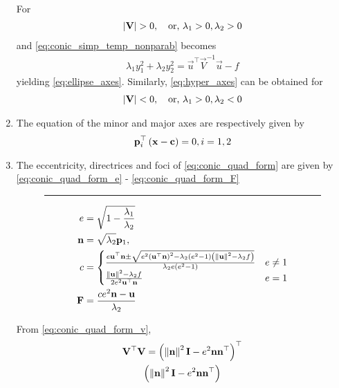 \documentclass[journal,12pt,twocolumn]{IEEEtran}
\renewcommand\thesection{\arabic{section}}
\renewcommand\thesubsection{\thesection.\arabic{subsection}}
\begin{document}
\begin{enumerate}[label=\thesubsection.\arabic*.,ref=\thesubsection.\theenumi]
\begin{align}
  \label{eq:hyper_axes}
\end{align} 
\solution For \begin{align} \left\vert\mathbf{V}\right\vert > 0, \quad \text{or, } \lambda_1 > 0, \lambda_2 > 0 
  \end{align} and \eqref{eq:conic_simp_temp_nonparab} becomes 
  \begin{align} 
	  \lambda_1y_1^2 +\lambda_2y_2^2 = 
  \vec{u}^{\top}\vec{V}^{-1}\vec{u} -f 
	  \label{eq:hyper-pair-cond}
  \end{align} 
  yielding        \eqref{eq:ellipse_axes}.  Similarly, \eqref{eq:hyper_axes} can be obtained for 
  \begin{align} 
    \label{eq:conic_hyper_cond}
    \left\vert\mathbf{V}\right\vert 
    < 0, \quad \text{or, } \lambda_1 > 0, \lambda_2 < 0 \end{align}
    \item The equation of the minor and major  axes are respectively given by 
  \begin{align}
\mathbf{p}_i^{\top}\left(\mathbf{x}-\mathbf{c}\right) = 0, i = 1,2
  \end{align}
  \item The eccentricity, directrices and foci of \eqref{eq:conic_quad_form} are given by 
  \eqref{eq:conic_quad_form_e} -
  \eqref{eq:conic_quad_form_F} 
  \begin{figure*}[!hb]
	  \centering
	  \hrule
\begin{align}
  \label{eq:conic_quad_form_e} 
  e&= \sqrt{1-\frac{\lambda_1}{\lambda_2}}
\\
\label{eq:conic_quad_form_nc} 
  \mathbf{n}&= \sqrt{\lambda_2}\mathbf{p}_1,  
  \\
	c &= 
  \begin{cases}
    \frac{e\mathbf{u}^{\top}\mathbf{n} \pm \sqrt{e^2\left(\mathbf{u}^{\top}\mathbf{n}\right)^2-\lambda_2\left(e^2-1\right)\left(\left\lVert\mathbf{u}\right\rVert^2 - \lambda_2 f\right)}}{\lambda_2e\left(e^2-1\right)} & e \ne 1
    \\
    \frac{\left\lVert\mathbf{u}\right\rVert^2 - \lambda_2 f   }{2e^2\mathbf{u}^{\top}\mathbf{n}} & e = 1
  \end{cases}
  \\
  \label{eq:conic_quad_form_F} 
  \mathbf{F}  &= \frac{ce^2\mathbf{n}-\mathbf{u}}{\lambda_2}
\end{align}  
  \end{figure*}
\solution 
From \eqref{eq:conic_quad_form_v},
  \begin{multline}
    \vec{V}^{\top} \vec{V}=\brak{\norm{\vec{n}}^2\vec{I}-e^2\vec{n}\vec{n}^{\top}}^{\top}
	  \\
	  \brak{\norm{\vec{n}}^2\vec{I}-e^2\vec{n}\vec{n}^{\top}}

\end{multline}
\end{enumerate}
\end{document}
